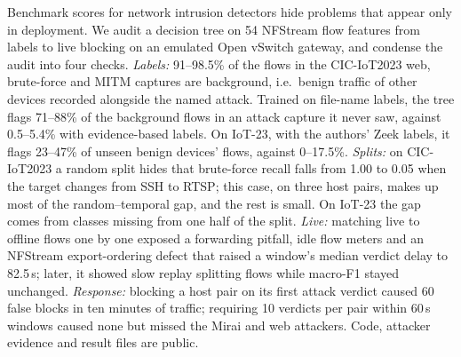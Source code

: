 Benchmark scores for network intrusion detectors hide problems that appear only in deployment. We audit a decision tree on 54 NFStream flow features from labels to live blocking on an emulated Open vSwitch gateway, and condense the audit into four checks. \emph{Labels:} 91--98.5\% of the flows in the CIC-IoT2023 web, brute-force and MITM captures are background, i.e.\ benign traffic of other devices recorded alongside the named attack. Trained on file-name labels, the tree flags 71--88\% of the background flows in an attack capture it never saw, against 0.5--5.4\% with evidence-based labels. On IoT-23, with the authors' Zeek labels, it flags 23--47\% of unseen benign devices' flows, against 0--17.5\%. \emph{Splits:} on CIC-IoT2023 a random split hides that brute-force recall falls from 1.00 to 0.05 when the target changes from SSH to RTSP; this case, on three host pairs, makes up most of the random--temporal gap, and the rest is small. On IoT-23 the gap comes from classes missing from one half of the split. \emph{Live:} matching live to offline flows one by one exposed a forwarding pitfall, idle flow meters and an NFStream export-ordering defect that raised a window's median verdict delay to 82.5\,s; later, it showed slow replay splitting flows while macro-F1 stayed unchanged. \emph{Response:} blocking a host pair on its first attack verdict caused 60 false blocks in ten minutes of traffic; requiring 10 verdicts per pair within 60\,s windows caused none but missed the Mirai and web attackers. Code, attacker evidence and result files are public.
